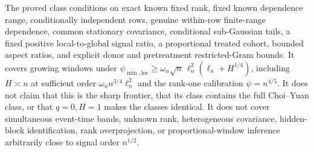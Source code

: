 \documentclass{article}
\begin{document}
The proved class conditions on exact known fixed rank, fixed known dependence range, conditionally independent rows, genuine within-row finite-range dependence, common stationary covariance, conditional sub-Gaussian tails, a fixed positive local-to-global signal ratio, a proportional treated cohort, bounded aspect ratios, and explicit donor and pretreatment restricted-Gram bounds. It covers growing windows under \(\psi_{\min,\mathrm{loc}}\ge\omega_n\sqrt n\,\ell_n^2(\ell_n+H^{1/4})\), including \(H\asymp n\) at sufficient order \(\omega_n n^{3/4}\ell_n^2\) and the rank-one calibration \(\psi=n^{4/5}\). It does not claim that this is the sharp frontier, that its class contains the full Choi--Yuan class, or that \(q=0,H=1\) makes the classes identical. It does not cover simultaneous event-time bands, unknown rank, heterogeneous covariance, hidden-block identification, rank overprojection, or proportional-window inference arbitrarily close to signal order \(n^{1/2}\).
\end{document}
